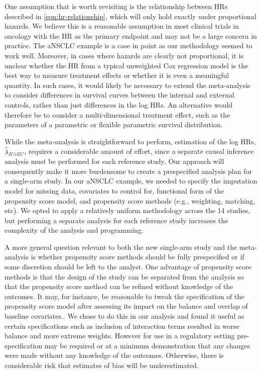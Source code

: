 \documentclass[11pt,final,fleqn]{article}\usepackage[]{graphicx}\usepackage[]{color}
\begin{document}
One assumption that is worth revisiting is the relationship between HRs described in \autoref{eqn:hr-relationship}, which will only hold exactly under proportional hazards. We believe this is a reasonable assumption in most clinical trials in oncology with the HR as the primary endpoint and may not be a large concern in practice. The aNSCLC example is a case in point as our methodology seemed to work well. Moreover, in cases where hazards are clearly not proportional, it is unclear whether the HR from a typical unweighted Cox regression model is the best way to measure treatment effects or whether it is even a meaningful quantity.\cite{schemper2009estimation, lin2020alternative, stensrud2020test} In such cases, it would likely be necessary to extend the meta-analysis  to consider differences in survival curves between the internal and external controls, rather than just differences in the log HRs. An alternative would therefore be to consider a multi-dimensional treatment effect, such as the parameters of a parametric \cite{ouwens2010network} or flexible parametric \cite{jansen2011network} survival distribution. 

While the meta-analysis is straightforward to perform, estimation of the log HRs, $\hat{\lambda}_{ICvEC}$, requires a considerable amount of effort, since a separate causal inference analysis must be performed for each reference study. Our approach will consequently make it more burdensome to create a prespecified analysis plan for a single-arm study. In our aNSCLC example, we needed to specify the imputation model for missing data, covariates to control for, functional form of the propensity score model, and propensity score methods (e.g., weighting, matching, etc). We opted to apply a relatively uniform methodology across the 14 studies, but performing a separate analysis for each reference study increases the complexity of the analysis and programming.  

A more general question relevant to both the new single-arm study and the meta-analysis is whether propensity score methods should be fully prespecified or if some discretion should be left to the analyst. One advantage of propensity score methods is that the design of the study can be separated from the analysis so that the propensity score method can be refined without knowledge of the outcomes.\cite{rubin2001using, rubin2008objective, stuart2010matching} It may, for instance, be reasonable to tweak the specification of the propensity score model after assessing its impact on the balance and overlap of baseline covariates.\cite{rosenbaum1984reducing, austin2008critical,belitser2011measuring}. We chose to do this in our analysis and found it useful as certain specifications such as inclusion of interaction terms resulted in worse balance and more extreme weights. However for use in a regulatory setting pre-specification may be required or at a minimum demonstration that any changes were made without any knowledge of the outcomes. Otherwise, there is considerable risk that estimates of bias will be underestimated.
\end{document}
